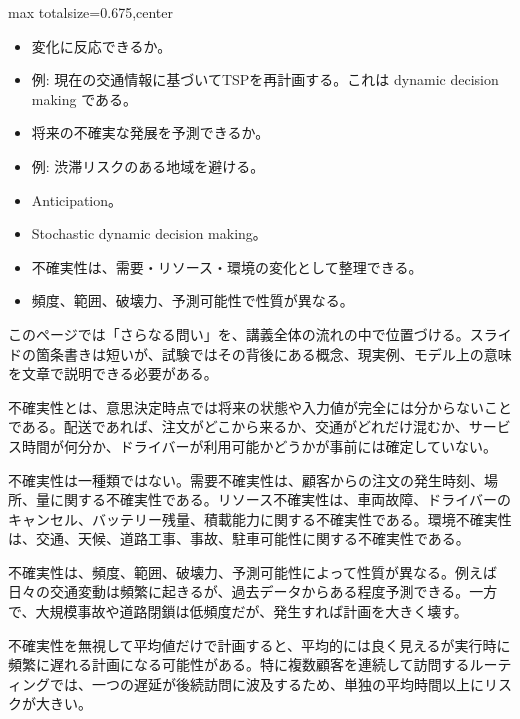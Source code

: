 \clearpage
{}
\begin{adjustbox}{max totalsize={\textwidth}{0.675\textheight},center}
\begin{minipage}{\textwidth}\scriptsize
\begin{minipage}[t]{0.485\textwidth}
\begin{itemize}
\item 変化に反応できるか。
\item 例: 現在の交通情報に基づいてTSPを再計画する。これは dynamic decision making である。
\item 将来の不確実な発展を予測できるか。
\item 例: 渋滞リスクのある地域を避ける。
\item Anticipation。
\item Stochastic dynamic decision making。
\end{itemize}
\begin{itemize}
\item 不確実性は、需要・リソース・環境の変化として整理できる。
\item 頻度、範囲、破壊力、予測可能性で性質が異なる。
\end{itemize}
\end{minipage}\hfill
\begin{minipage}[t]{0.485\textwidth}
このページでは「さらなる問い」を、講義全体の流れの中で位置づける。スライドの箇条書きは短いが、試験ではその背後にある概念、現実例、モデル上の意味を文章で説明できる必要がある。\par
不確実性とは、意思決定時点では将来の状態や入力値が完全には分からないことである。配送であれば、注文がどこから来るか、交通がどれだけ混むか、サービス時間が何分か、ドライバーが利用可能かどうかが事前には確定していない。\par
不確実性は一種類ではない。需要不確実性は、顧客からの注文の発生時刻、場所、量に関する不確実性である。リソース不確実性は、車両故障、ドライバーのキャンセル、バッテリー残量、積載能力に関する不確実性である。環境不確実性は、交通、天候、道路工事、事故、駐車可能性に関する不確実性である。\par
不確実性は、頻度、範囲、破壊力、予測可能性によって性質が異なる。例えば日々の交通変動は頻繁に起きるが、過去データからある程度予測できる。一方で、大規模事故や道路閉鎖は低頻度だが、発生すれば計画を大きく壊す。\par
不確実性を無視して平均値だけで計画すると、平均的には良く見えるが実行時に頻繁に遅れる計画になる可能性がある。特に複数顧客を連続して訪問するルーティングでは、一つの遅延が後続訪問に波及するため、単独の平均時間以上にリスクが大きい。\par

\end{minipage}
\end{minipage}
\end{adjustbox}
